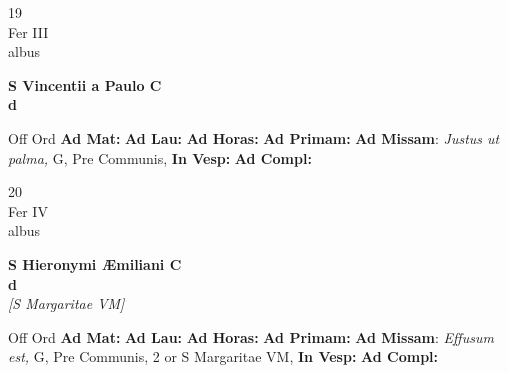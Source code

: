 \documentclass[10pt, openany]{book}
\begin{document}
    \begin{center}
        \begin{minipage}{3.5in}
            \vspace{2em}
            \begin{minipage}{0.5in}
                {\Huge 19} \\
                {\normalsize Fer III} \\
                {\normalsize albus}
            \end{minipage}
            \begin{minipage}{3.0in}
                \textbf{ \large S Vincentii a Paulo C \\
                \textnormal{\normalsize d}} \\ 
            \end{minipage}
            \begin{justify}Off Ord
                \textbf{Ad Mat: }
                \textbf{Ad Lau: }
                \textbf{Ad Horas: }
                \textbf{Ad Primam: }\textbf{Ad Missam}: \textit{Justus ut palma,} G, Pre Communis,  
                \textbf{In Vesp: }
                \textbf{Ad Compl: }
            \end{justify}
        \end{minipage}
    \end{center}

    \begin{center}
        \begin{minipage}{3.5in}
            \vspace{2em}
            \begin{minipage}{0.5in}
                {\Huge 20} \\
                {\normalsize Fer IV} \\
                {\normalsize albus}
            \end{minipage}
            \begin{minipage}{3.0in}
                \textbf{ \large S Hieronymi Æmiliani C \\
                \textnormal{\normalsize d}} \\ \textit{[S Margaritae VM]} \\ 
            \end{minipage}
            \begin{justify}Off Ord
                \textbf{Ad Mat: }
                \textbf{Ad Lau: }
                \textbf{Ad Horas: }
                \textbf{Ad Primam: }\textbf{Ad Missam}: \textit{Effusum est,} G, Pre Communis, 2 or S Margaritae VM,  
                \textbf{In Vesp: }
                \textbf{Ad Compl: }
            \end{justify}
        \end{minipage}
    \end{center}
\end{document}
